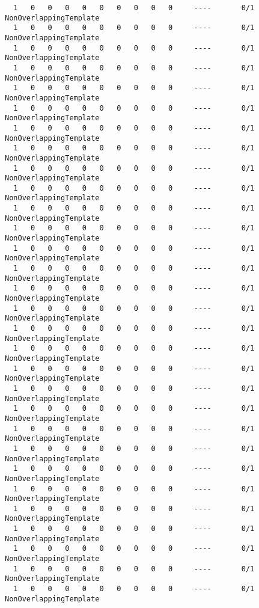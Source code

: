 \begin{code}
\begin{verbatim}
  1   0   0   0   0   0   0   0   0   0     ----       0/1       NonOverlappingTemplate
  1   0   0   0   0   0   0   0   0   0     ----       0/1       NonOverlappingTemplate
  1   0   0   0   0   0   0   0   0   0     ----       0/1       NonOverlappingTemplate
  1   0   0   0   0   0   0   0   0   0     ----       0/1       NonOverlappingTemplate
  1   0   0   0   0   0   0   0   0   0     ----       0/1       NonOverlappingTemplate
  1   0   0   0   0   0   0   0   0   0     ----       0/1       NonOverlappingTemplate
  1   0   0   0   0   0   0   0   0   0     ----       0/1       NonOverlappingTemplate
  1   0   0   0   0   0   0   0   0   0     ----       0/1       NonOverlappingTemplate
  1   0   0   0   0   0   0   0   0   0     ----       0/1       NonOverlappingTemplate
  1   0   0   0   0   0   0   0   0   0     ----       0/1       NonOverlappingTemplate
  1   0   0   0   0   0   0   0   0   0     ----       0/1       NonOverlappingTemplate
  1   0   0   0   0   0   0   0   0   0     ----       0/1       NonOverlappingTemplate
  1   0   0   0   0   0   0   0   0   0     ----       0/1       NonOverlappingTemplate
  1   0   0   0   0   0   0   0   0   0     ----       0/1       NonOverlappingTemplate
  1   0   0   0   0   0   0   0   0   0     ----       0/1       NonOverlappingTemplate
  1   0   0   0   0   0   0   0   0   0     ----       0/1       NonOverlappingTemplate
  1   0   0   0   0   0   0   0   0   0     ----       0/1       NonOverlappingTemplate
  1   0   0   0   0   0   0   0   0   0     ----       0/1       NonOverlappingTemplate
  1   0   0   0   0   0   0   0   0   0     ----       0/1       NonOverlappingTemplate
  1   0   0   0   0   0   0   0   0   0     ----       0/1       NonOverlappingTemplate
  1   0   0   0   0   0   0   0   0   0     ----       0/1       NonOverlappingTemplate
  1   0   0   0   0   0   0   0   0   0     ----       0/1       NonOverlappingTemplate
  1   0   0   0   0   0   0   0   0   0     ----       0/1       NonOverlappingTemplate
  1   0   0   0   0   0   0   0   0   0     ----       0/1       NonOverlappingTemplate
  1   0   0   0   0   0   0   0   0   0     ----       0/1       NonOverlappingTemplate
  1   0   0   0   0   0   0   0   0   0     ----       0/1       NonOverlappingTemplate
  1   0   0   0   0   0   0   0   0   0     ----       0/1       NonOverlappingTemplate
  1   0   0   0   0   0   0   0   0   0     ----       0/1       NonOverlappingTemplate
  1   0   0   0   0   0   0   0   0   0     ----       0/1       NonOverlappingTemplate
  1   0   0   0   0   0   0   0   0   0     ----       0/1       NonOverlappingTemplate

\end{verbatim}
\end{code}
